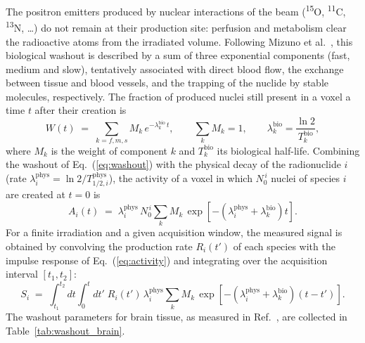 \documentclass[11pt]{article}
\newcommand{\iso}[2]{\textsuperscript{#1}#2}
\begin{document}
The positron emitters produced by nuclear interactions of the beam
(\iso{15}{O}, \iso{11}{C}, \iso{13}{N}, \dots) do not remain at their
production site: perfusion and metabolism clear the radioactive atoms from the
irradiated volume. Following Mizuno et al.~\cite{mizuno2003}, this biological
washout is described by a sum of three exponential components (fast, medium and
slow), tentatively associated with direct blood flow, the exchange between
tissue and blood vessels, and the trapping of the nuclide by stable molecules,
respectively. The fraction of produced nuclei still present in a voxel a time
$t$ after their creation is
%
\begin{equation}
  W(t) \;=\; \sum_{k=f,m,s} M_k\, e^{-\lambda_k^{\mathrm{bio}}\,t},
  \qquad \sum_{k} M_k = 1,
  \qquad \lambda_k^{\mathrm{bio}} = \frac{\ln 2}{T_k^{\mathrm{bio}}},
  \label{eq:washout}
\end{equation}
%
where $M_k$ is the weight of component $k$ and $T_k^{\mathrm{bio}}$ its
biological half-life. Combining the washout of Eq.~(\ref{eq:washout}) with the
physical decay of the radionuclide $i$ (rate
$\lambda_i^{\mathrm{phys}}=\ln 2 / T_{1/2,i}^{\mathrm{phys}}$), the activity of
a voxel in which $N_0^{\,i}$ nuclei of species $i$ are created at $t=0$ is
%
\begin{equation}
  A_i(t) \;=\; \lambda_i^{\mathrm{phys}}\, N_0^{\,i}
  \sum_{k} M_k\,
  \exp\!\left[-\left(\lambda_i^{\mathrm{phys}}
  + \lambda_k^{\mathrm{bio}}\right) t\right].
  \label{eq:activity}
\end{equation}
%
For a finite irradiation and a given acquisition window, the measured signal is
obtained by convolving the production rate $R_i(t')$ of each species with the
impulse response of Eq.~(\ref{eq:activity}) and integrating over the
acquisition interval $[t_1,t_2]$:
%
\begin{equation}
  S_i \;=\; \int_{t_1}^{t_2}\!\! dt
  \int_{0}^{t}\!\! dt'\; R_i(t')\,
  \lambda_i^{\mathrm{phys}}
  \sum_{k} M_k\,
  \exp\!\left[-\left(\lambda_i^{\mathrm{phys}}
  + \lambda_k^{\mathrm{bio}}\right)(t-t')\right].
  \label{eq:measured}
\end{equation}
%
The washout parameters for brain tissue, as measured in
Ref.~\cite{mizuno2003}, are collected in Table~\ref{tab:washout_brain}.
\end{document}
